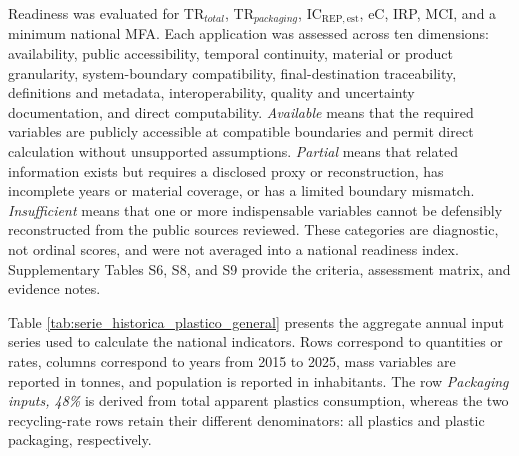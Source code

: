\documentclass[review,10pt]{elsarticle}
\newcommand{\revpar}[1]{#1\par\medskip}
\begin{document}
\revpar{Readiness was evaluated for TR$_{total}$, TR$_{packaging}$, IC$_{\mathrm{REP,est}}$, eC, IRP, MCI, and a minimum national MFA. Each application was assessed across ten dimensions: availability, public accessibility, temporal continuity, material or product granularity, system-boundary compatibility, final-destination traceability, definitions and metadata, interoperability, quality and uncertainty documentation, and direct computability. \textit{Available} means that the required variables are publicly accessible at compatible boundaries and permit direct calculation without unsupported assumptions. \textit{Partial} means that related information exists but requires a disclosed proxy or reconstruction, has incomplete years or material coverage, or has a limited boundary mismatch. \textit{Insufficient} means that one or more indispensable variables cannot be defensibly reconstructed from the public sources reviewed. These categories are diagnostic, not ordinal scores, and were not averaged into a national readiness index. Supplementary Tables S6, S8, and S9 provide the criteria, assessment matrix, and evidence notes.}

\revpar{Table \ref{tab:serie_historica_plastico_general} presents the aggregate annual input series used to calculate the national indicators. Rows correspond to quantities or rates, columns correspond to years from 2015 to 2025, mass variables are reported in tonnes, and population is reported in inhabitants. The row \textit{Packaging inputs, 48\%} is derived from total apparent plastics consumption, whereas the two recycling-rate rows retain their different denominators: all plastics and plastic packaging, respectively.}
\end{document}
